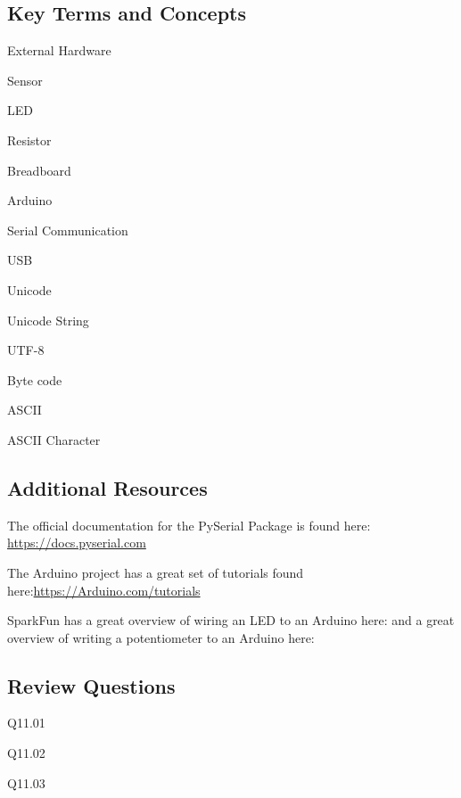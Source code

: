 \documentclass{book}
\newenvironment{key_terms}{\begin{multicols}{3}}{\end{multicols}} %
\begin{document}
    
        \subsection{Key Terms and Concepts}\label{key-terms-and-concepts}
    




    
        \begin{key_terms}
        External Hardware

Sensor

LED

Resistor

Breadboard

Arduino

Serial Communication

USB

Unicode

Unicode String

UTF-8

Byte code

ASCII

ASCII Character
        \end{key_terms}

    




    
        \subsection{Additional Resources}\label{additional-resources}

The official documentation for the PySerial Package is found here:
\protect\hyperlink{}{https://docs.pyserial.com}

The Arduino project has a great set of tutorials found
here:\protect\hyperlink{}{https://Arduino.com/tutorials}

SparkFun has a great overview of wiring an LED to an Arduino here: and a
great overview of writing a potentiometer to an Arduino here:
    




    
        \subsection{Review Questions}\label{review-questions}

Q11.01

Q11.02

Q11.03
\end{document}
